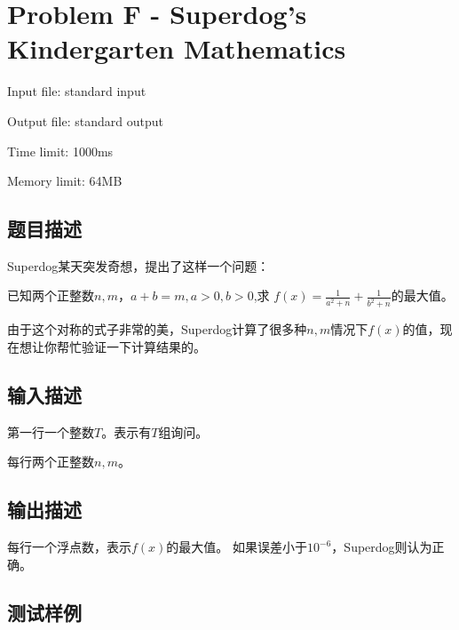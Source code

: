 \newpage
\section{Problem F - Superdog's Kindergarten Mathematics}
{ \limitfont{}
Input file: standard input \par
Output file: standard output \par
Time limit: 1000ms \par
Memory limit: 64MB \par
}
\subsection*{题目描述}
Superdog某天突发奇想，提出了这样一个问题：

已知两个正整数$n,m$，$a+b=m,a>0,b>0$,求 $f(x)=\frac{1}{a^2+n} + \frac{1}{b^2+n}$的最大值。

由于这个对称的式子非常的美，Superdog计算了很多种$n,m$情况下$f(x)$的值，现在想让你帮忙验证一下计算结果的。
\subsection*{输入描述}

第一行一个整数$T$。表示有$T$组询问。

每行两个正整数$n,m$。

\subsection*{输出描述}

每行一个浮点数，表示$f(x)$的最大值。
如果误差小于$10^{-6}$，Superdog则认为正确。

\subsection*{测试样例}

